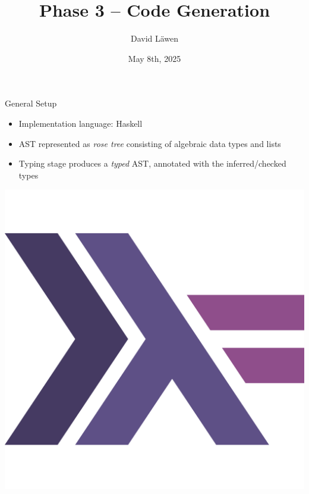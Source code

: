 \documentclass[dvipsnames,aspectratio=169]{beamer}
\title[Phase 3 -- Code Generation]%
{Phase 3 -- Code Generation}
\subtitle
{}
\author%
{David Läwen}
\institute[]%
{Compiler Construction}
\date[May 8th, 2025] %
{May 8th, 2025}
\begin{document}
\begin{frame}
  \titlepage
\end{frame}

\begin{frame}{General Setup}

  \begin{minipage}{.6\textwidth}

    \begin{itemize}
      \item Implementation language: Haskell
      \item AST represented as \emph{rose tree} consisting of algebraic data
            types and lists
      \item Typing stage produces a \emph{typed} AST, annotated with the
            inferred/checked types
    \end{itemize}

  \end{minipage}\hfill
  \begin{minipage}{.3\textwidth}
    \includegraphics[scale=.17]{assets/haskell-icon.pdf}
  \end{minipage}

\end{frame}


\end{document}
